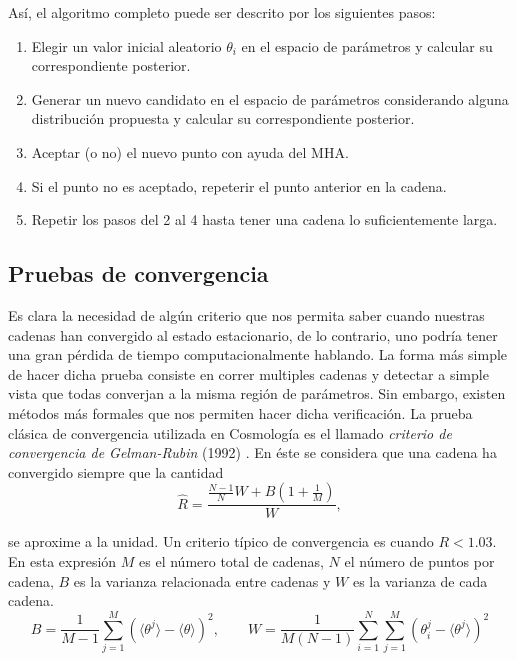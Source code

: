 \documentclass[10.5pt,prb,
               showpacs,            %
               preprintnumbers,     %
               aps,                 %
               prl,          	    %
               letterpaper,             %
               superscriptaddress,      %
               nofootinbib,         %
               tightenlines,        %
               floats,floatfix      %
               ,usenatbib]{revtex4-1}%
\begin{document}
As\'i, el algoritmo completo puede ser descrito por los siguientes pasos:
%
	\begin{enumerate}
		\item Elegir un valor inicial aleatorio $\theta_i$ en el espacio de par\'ametros y calcular su correspondiente posterior.
		\item Generar un nuevo candidato en el espacio de par\'ametros considerando alguna distribuci\'on propuesta 
			y calcular su 	correspondiente posterior.
		\item Aceptar (o no) el nuevo punto con ayuda del MHA.
		\item Si el punto no es aceptado, repeterir el punto anterior en la cadena.
		\item Repetir los pasos del 2 al 4 hasta tener una cadena lo suficientemente larga.
	\end{enumerate}

\subsection{Pruebas de convergencia}

Es clara la necesidad de alg\'un criterio que nos permita saber cuando nuestras cadenas 
han convergido al estado estacionario, de lo contrario, uno podr\'ia tener una gran p\'erdida de 
tiempo computacionalmente hablando. La forma m\'as simple de 
hacer dicha prueba consiste en correr multiples cadenas y detectar a simple vista  
que todas converjan a la misma regi\'on de par\'ametros. Sin embargo, existen m\'etodos m\'as formales 
que nos permiten hacer dicha verificaci\'on. La prueba cl\'asica de convergencia utilizada en Cosmolog\'ia 
es el llamado \textit{criterio de convergencia de Gelman-Rubin}  (1992) \cite{AlanH,LicV2}. En \'este se considera que una 
cadena ha convergido siempre que la cantidad 
%
	\begin{equation}
		\hat R=\frac{\frac{N-1}{N}W+B(1+\frac{1}{M})}{W},
	\end{equation}

\noindent
se aproxime a la unidad. Un criterio t\'ipico de convergencia es cuando $R<1.03$. En esta expresi\'on $M$ 
es el n\'umero total de cadenas, $N$ el n\'umero de puntos por cadena, $B$ es la varianza relacionada entre cadenas y
$W$ es la varianza de cada cadena. 
% 
	\begin{equation}
		B=\frac{1}{M-1}\sum_{j=1}^M(\langle\theta^j\rangle-\langle\theta\rangle)^2, \qquad 
				W=\frac{1}{M(N-1)}\sum_{i=1}^N\sum_{j=1}^M(\theta_i^j-\langle\theta^j\rangle)^2
	\end{equation}
\end{document}
